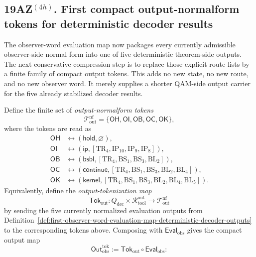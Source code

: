 \subsection*{19AZ$^{(4h)}$. First compact output-normalform tokens for deterministic decoder results}
\label{sec:first-compact-output-normalform-tokens-deterministic-decoder-results}
The observer-word evaluation map now packages every currently admissible observer-side normal form into one of five deterministic theorem-side outputs. The next conservative compression step is to replace those explicit route lists by a finite family of compact output tokens. This adds no new state, no new route, and no new observer word. It merely supplies a shorter QAM-side output carrier for the five already stabilized decoder results.

\begin{definition}
\label{def:first-compact-output-normalform-tokens-deterministic-decoder-results}
Define the finite set of \emph{output-normalform tokens}
\[
\mathcal T^{\mathrm{nf}}_{\mathrm{out}}
=
\{\mathsf{OH},\mathsf{OI},\mathsf{OB},\mathsf{OC},\mathsf{OK}\},
\]
where the tokens are read as
\begin{align*}
\mathsf{OH}&\leftrightarrow (\mathsf{hold},\varnothing),\\
\mathsf{OI}&\leftrightarrow (\mathsf{ip},[\mathrm{TR}_4,\mathrm{IP}_{10},\mathrm{IP}_9,\mathrm{IP}_8]),\\
\mathsf{OB}&\leftrightarrow (\mathsf{bsbl},[\mathrm{TR}_4,\mathrm{BS}_1,\mathrm{BS}_3,\mathrm{BL}_2]),\\
\mathsf{OC}&\leftrightarrow (\mathsf{continue},[\mathrm{TR}_4,\mathrm{BS}_1,\mathrm{BS}_3,\mathrm{BL}_2,\mathrm{BL}_4]),\\
\mathsf{OK}&\leftrightarrow (\mathsf{kernel},[\mathrm{TR}_4,\mathrm{BS}_1,\mathrm{BS}_3,\mathrm{BL}_2,\mathrm{BL}_4,\mathrm{BL}_5]).
\end{align*}
Equivalently, define the \emph{output-tokenization map}
\[
\mathsf{Tok}_{\mathrm{out}}:
Q_{\mathrm{dec}}\times \mathcal R_{\mathrm{tool}}^{\mathrm{out}}
\longrightarrow
\mathcal T^{\mathrm{nf}}_{\mathrm{out}}
\]
by sending the five currently normalized evaluation outputs from Definition~\ref{def:first-observer-word-evaluation-map-deterministic-decoder-outputs} to the corresponding tokens above. Composing with \(\mathsf{Eval}_{\mathrm{obs}}\) gives the compact output map
\[
\mathsf{Out}^{\mathrm{tok}}_{\mathrm{obs}}
:=
\mathsf{Tok}_{\mathrm{out}}\circ \mathsf{Eval}_{\mathrm{obs}}:
\]
\end{definition}
